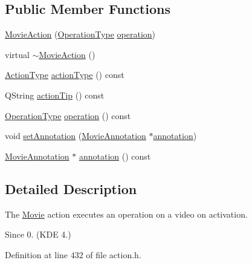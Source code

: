 \subsection*{Public Member Functions}
\begin{DoxyCompactItemize}
\item 
\hyperlink{classOkular_1_1MovieAction_a8b1a3e82ce7e16c16acdd8c5d23d494a}{Movie\+Action} (\hyperlink{classOkular_1_1MovieAction_ade5698179043c1075b37aa1dc7638331}{Operation\+Type} \hyperlink{classOkular_1_1MovieAction_a402533ade94cb600a6f8666401f84aa6}{operation})
\item 
virtual \hyperlink{classOkular_1_1MovieAction_a3cd3b167a5037b07cdd4a138c09be15d}{$\sim$\+Movie\+Action} ()
\item 
\hyperlink{classOkular_1_1Action_abe474735af30ea76105595533df9ec47}{Action\+Type} \hyperlink{classOkular_1_1MovieAction_aa3aaf75f235f6c396aa913f4dd2df385}{action\+Type} () const 
\item 
Q\+String \hyperlink{classOkular_1_1MovieAction_a137b2ada90d7bf6ae1e110cd7b43580c}{action\+Tip} () const 
\item 
\hyperlink{classOkular_1_1MovieAction_ade5698179043c1075b37aa1dc7638331}{Operation\+Type} \hyperlink{classOkular_1_1MovieAction_a402533ade94cb600a6f8666401f84aa6}{operation} () const 
\item 
void \hyperlink{classOkular_1_1MovieAction_a1b9917f11346c3bce889e31aeb32e3b2}{set\+Annotation} (\hyperlink{classOkular_1_1MovieAnnotation}{Movie\+Annotation} $\ast$\hyperlink{classOkular_1_1MovieAction_a4b3a7f5084a462c8ebff8cf747069b9c}{annotation})
\item 
\hyperlink{classOkular_1_1MovieAnnotation}{Movie\+Annotation} $\ast$ \hyperlink{classOkular_1_1MovieAction_a4b3a7f5084a462c8ebff8cf747069b9c}{annotation} () const 
\end{DoxyCompactItemize}


\subsection{Detailed Description}
The \hyperlink{classOkular_1_1Movie}{Movie} action executes an operation on a video on activation.

\begin{DoxySince}{Since}
0. (K\+D\+E 4.) 
\end{DoxySince}


Definition at line 432 of file action.\+h.



